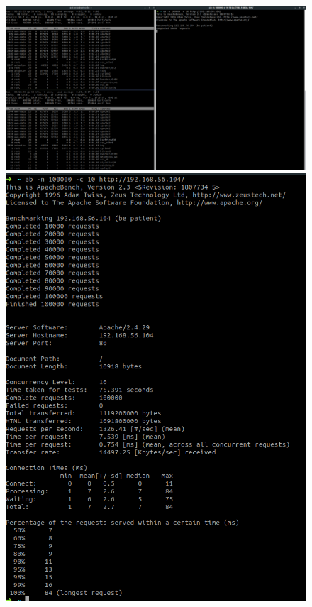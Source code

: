 \documentclass[12pt]{article}
\begin{document}
\begin{figure}[H]
\center
\includegraphics[scale=0.2]{20.png}
\includegraphics[scale=0.3]{21.png}
\end{figure}
\end{document}
